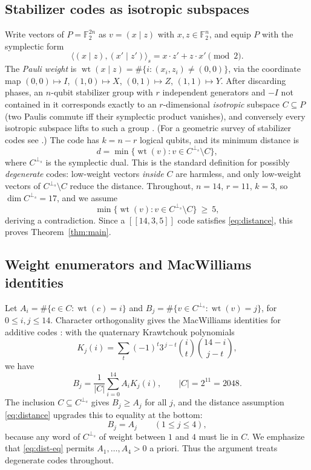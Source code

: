 \documentclass[11pt]{amsart}
\theoremstyle{definition}
\theoremstyle{remark}
\DeclareMathOperator{\wt}{wt}
\newcommand{\F}{\mathbb{F}}
\newcommand{\perps}{{\perp_s}}
\newcommand{\sform}[2]{\langle #1,#2\rangle_s}
\newcommand{\code}[1]{[\![#1]\!]}
\begin{document}
\subsection{Stabilizer codes as isotropic subspaces}
Write vectors of $P=\F_2^{2n}$ as $v=(x\mid z)$ with $x,z\in\F_2^n$, and
equip $P$ with the symplectic form
\[
\sform{(x\mid z)}{(x'\mid z')}=x\cdot z'+z\cdot x' \pmod 2 .
\]
The \emph{Pauli weight} is
$\wt(x\mid z)=\#\{i:(x_i,z_i)\neq(0,0)\}$, via the coordinate map
$(0,0)\mapsto I$, $(1,0)\mapsto X$, $(0,1)\mapsto Z$, $(1,1)\mapsto Y$.
After discarding phases, an $n$-qubit stabilizer group with $r$ independent
generators and $-I$ not contained in it corresponds exactly to an
$r$-dimensional \emph{isotropic} subspace $C\subseteq P$ (two Paulis
commute iff their symplectic product vanishes), and conversely every
isotropic subspace lifts to such a group \cite{CRSS1998,Gottesman1997}.
(For a geometric survey of stabilizer codes see
\cite{BallCentellesHuber}.)  The code has $k=n-r$ logical qubits, and its
minimum distance is
\[
d=\min\{\wt(v):v\in C^{\perps}\setminus C\},
\]
where $C^{\perps}$ is the symplectic dual.  This is the standard
definition for possibly \emph{degenerate} codes: low-weight vectors
\emph{inside} $C$ are harmless, and only low-weight vectors of
$C^{\perps}\setminus C$ reduce the distance.  Throughout, $n=14$, $r=11$,
$k=3$, so $\dim C^{\perps}=17$, and we assume
\begin{equation}\label{eq:distance}
\min\{\wt(v):v\in C^{\perps}\setminus C\}\ \ge\ 5 ,
\end{equation}
deriving a contradiction.  Since a $\code{14,3,5}$ code satisfies
\eqref{eq:distance}, this proves Theorem~\ref{thm:main}.

\subsection{Weight enumerators and MacWilliams identities}
Let $A_i=\#\{c\in C:\wt(c)=i\}$ and $B_j=\#\{v\in C^{\perps}:\wt(v)=j\}$,
for $0\le i,j\le 14$.  Character orthogonality gives the MacWilliams
identities for additive codes \cite{CRSS1998}: with the quaternary
Krawtchouk polynomials
\begin{equation}\label{eq:kraw}
K_j(i)=\sum_{t}(-1)^t3^{\,j-t}\binom{i}{t}\binom{14-i}{j-t},
\end{equation}
we have
\begin{equation}\label{eq:mw}
B_j=\frac{1}{|C|}\sum_{i=0}^{14}A_iK_j(i),\qquad |C|=2^{11}=2048 .
\end{equation}
The inclusion $C\subseteq C^{\perps}$ gives $B_j\ge A_j$ for all $j$, and
the distance assumption \eqref{eq:distance} upgrades this to equality at
the bottom:
\begin{equation}\label{eq:dist-eq}
B_j=A_j \qquad (1\le j\le 4),
\end{equation}
because any word of $C^{\perps}$ of weight between $1$ and $4$ must lie in
$C$.  We emphasize that \eqref{eq:dist-eq} permits $A_1,\dots,A_4>0$
a priori.  Thus the argument treats degenerate codes throughout.
\end{document}
